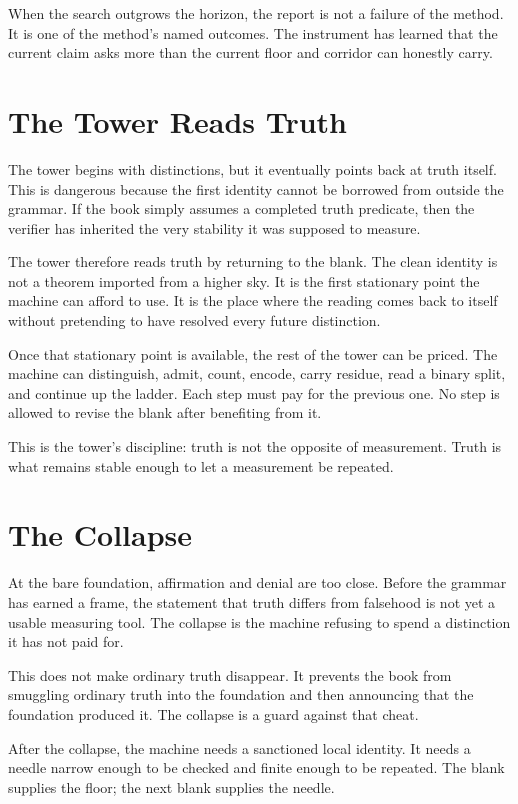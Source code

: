 When the search outgrows the horizon, the report is not a failure of the
method. It is one of the method's named outcomes. The instrument has learned
that the current claim asks more than the current floor and corridor can
honestly carry.

\section{The Tower Reads Truth}

The tower begins with distinctions, but it eventually points back at truth
itself. This is dangerous because the first identity cannot be borrowed from
outside the grammar. If the book simply assumes a completed truth predicate,
then the verifier has inherited the very stability it was supposed to measure.

The tower therefore reads truth by returning to the blank. The clean identity
is not a theorem imported from a higher sky. It is the first stationary point
the machine can afford to use. It is the place where the reading comes back to
itself without pretending to have resolved every future distinction.

Once that stationary point is available, the rest of the tower can be priced.
The machine can distinguish, admit, count, encode, carry residue, read a binary
split, and continue up the ladder. Each step must pay for the previous one. No
step is allowed to revise the blank after benefiting from it.

This is the tower's discipline: truth is not the opposite of measurement. Truth
is what remains stable enough to let a measurement be repeated.

\section{The Collapse}

At the bare foundation, affirmation and denial are too close. Before the
grammar has earned a frame, the statement that truth differs from falsehood is
not yet a usable measuring tool. The collapse is the machine refusing to spend
a distinction it has not paid for.

This does not make ordinary truth disappear. It prevents the book from
smuggling ordinary truth into the foundation and then announcing that the
foundation produced it. The collapse is a guard against that cheat.

After the collapse, the machine needs a sanctioned local identity. It needs a
needle narrow enough to be checked and finite enough to be repeated. The blank
supplies the floor; the next blank supplies the needle.

